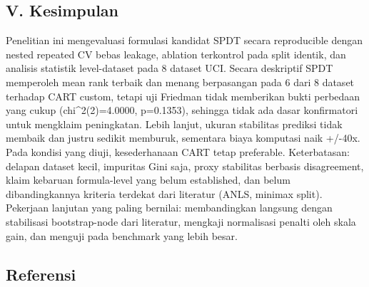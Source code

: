 \documentclass[
  conference]{IEEEtran}
\begin{document}
\subsection{V. Kesimpulan}\label{v.-kesimpulan}

Penelitian ini mengevaluasi formulasi kandidat SPDT secara reproducible
dengan nested repeated CV bebas leakage, ablation terkontrol pada split
identik, dan analisis statistik level-dataset pada 8 dataset UCI. Secara
deskriptif SPDT memperoleh mean rank terbaik dan menang berpasangan pada
6 dari 8 dataset terhadap CART custom, tetapi uji Friedman tidak
memberikan bukti perbedaan yang cukup (chi\^{}2(2)=4.0000, p=0.1353),
sehingga tidak ada dasar konfirmatori untuk mengklaim peningkatan. Lebih
lanjut, ukuran stabilitas prediksi tidak membaik dan justru sedikit
memburuk, sementara biaya komputasi naik +/-40x. Pada kondisi yang
diuji, kesederhanaan CART tetap preferable. Keterbatasan: delapan
dataset kecil, impuritas Gini saja, proxy stabilitas berbasis
disagreement, klaim kebaruan formula-level yang belum established, dan
belum dibandingkannya kriteria terdekat dari literatur (ANLS, minimax
split). Pekerjaan lanjutan yang paling bernilai: membandingkan langsung
dengan stabilisasi bootstrap-node dari literatur, mengkaji normalisasi
penalti oleh skala gain, dan menguji pada benchmark yang lebih besar.

\subsection{Referensi}\label{referensi}
\end{document}
